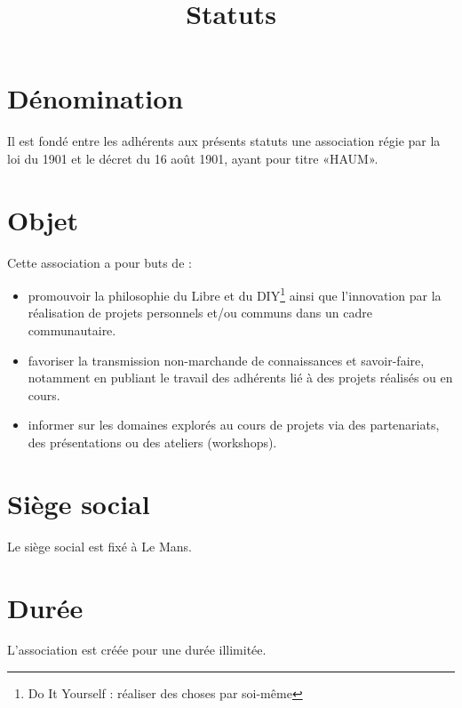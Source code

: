 \documentclass[a4paper, 11pt]{article}
\title{Statuts}
\author{}
\date{}
\newcommand{\nomHS}{HAUM}
\begin{document}
    \maketitle

\section{Dénomination} %

Il est fondé entre les adhérents aux présents statuts une association régie par la loi du 1901 et le décret du 16 août
1901, ayant pour titre «\nomHS».


\section{Objet} %

Cette association a pour buts de :

\begin{itemize}
    \item promouvoir la philosophie du Libre et du DIY\footnote{Do It Yourself : réaliser des choses par
        soi-même} ainsi que l'innovation par la réalisation de projets personnels et/ou communs dans un cadre
        communautaire.
    \item favoriser la transmission non-marchande de connaissances et savoir-faire, notamment en publiant le travail des
        adhérents lié à des projets réalisés ou en cours.
    \item informer sur les domaines explorés au cours de projets via des partenariats, des présentations ou des ateliers
        (workshops).
\end{itemize}


\section{Siège social} %

Le siège social est fixé à Le Mans.


\section{Durée} %

L'association est créée pour une durée illimitée.

\end{document}
